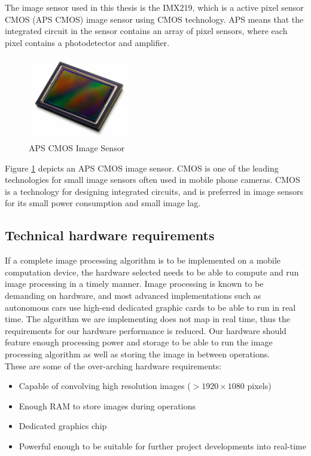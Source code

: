 The image sensor used in this thesis is the IMX219, which is a active pixel sensor CMOS (APS CMOS) image sensor using CMOS technology. APS means that the integrated circuit in the sensor contains an array of pixel sensors, where each pixel contains a photodetector and amplifier.

\begin{figure}[h]
  \centering
  \includegraphics[width=0.4\textwidth]{fig/cmos}
  \caption{APS CMOS Image Sensor}
  \label{fig:cmos}
\end{figure}

Figure \ref{fig:cmos} depicts an APS CMOS image sensor. CMOS is one of the leading technologies for small image sensors often used in mobile phone cameras. CMOS is a technology for designing integrated circuits, and is preferred in image sensors for its small power consumption and small image lag. \\





\newpage
\subsection{Technical hardware requirements}
If a complete image processing algorithm is to be implemented on a mobile computation device, the hardware selected needs to be able to compute and run image processing in a timely manner. Image processing is known to be demanding on hardware, and most advanced implementations such as autonomous cars use high-end dedicated graphic cards \cite{tesla} to be able to run in real time. The algorithm we are implementing does not map in real time, thus the requirements for our hardware performance is reduced. Our hardware should feature enough processing power and storage to be able to run the image processing algorithm as well as storing the image in between operations.\\

These are some of the over-arching hardware requirements:
\begin{itemize}
\item Capable of convolving high resolution images ($>1920\times1080$ pixels)
\item Enough RAM to store images during operations
\item Dedicated graphics chip
\item Powerful enough to be suitable for further project developments into real-time
\end{itemize}

